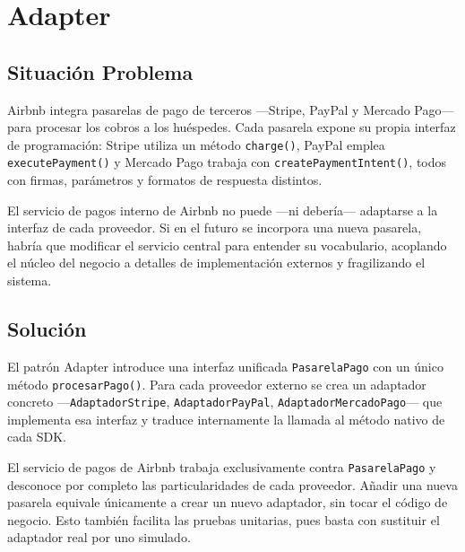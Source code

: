
\chapter{Adapter}

\section{Situación Problema}

Airbnb integra pasarelas de pago de terceros —Stripe, PayPal y
Mercado Pago— para procesar los cobros a los huéspedes. Cada pasarela
expone su propia interfaz de programación: Stripe utiliza un método
\texttt{charge()}, PayPal emplea \texttt{executePayment()} y Mercado
Pago trabaja con \texttt{createPaymentIntent()}, todos con firmas,
parámetros y formatos de respuesta distintos.

El servicio de pagos interno de Airbnb no puede —ni debería— adaptarse
a la interfaz de cada proveedor. Si en el futuro se incorpora una nueva
pasarela, habría que modificar el servicio central para entender su
vocabulario, acoplando el núcleo del negocio a detalles de implementación
externos y fragilizando el sistema.

\section{Solución}

El patrón Adapter introduce una interfaz unificada \texttt{PasarelaPago}
con un único método \texttt{procesarPago()}. Para cada proveedor externo
se crea un adaptador concreto —\texttt{AdaptadorStripe},
\texttt{AdaptadorPayPal}, \texttt{AdaptadorMercadoPago}— que implementa
esa interfaz y traduce internamente la llamada al método nativo de cada
SDK.

El servicio de pagos de Airbnb trabaja exclusivamente contra
\texttt{PasarelaPago} y desconoce por completo las particularidades de
cada proveedor. Añadir una nueva pasarela equivale únicamente a crear
un nuevo adaptador, sin tocar el código de negocio. Esto también
facilita las pruebas unitarias, pues basta con sustituir el adaptador
real por uno simulado.


